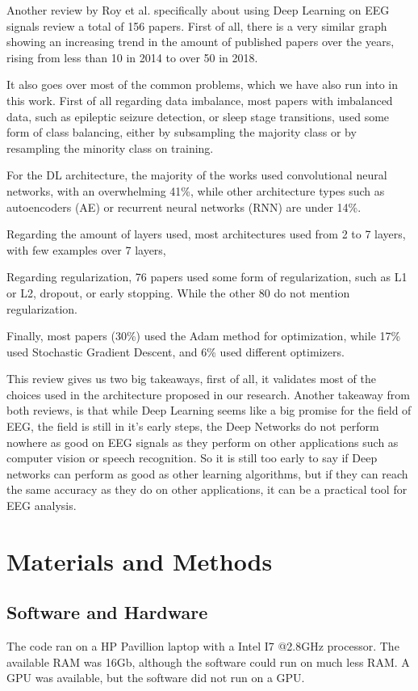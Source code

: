 \documentclass[conference]{IEEEtran}
\begin{document}
Another review by Roy et al.\cite{RoyReview} specifically about using Deep Learning on EEG signals review a total of 156 papers. First of all, there is a very similar graph showing an increasing trend in the amount of published papers over the years, rising from less than 10 in 2014 to over 50 in 2018.


It also goes over most of the common problems, which we have also run into in this work. First of all regarding data imbalance, most papers with imbalanced data, such as epileptic seizure detection, or sleep stage transitions, used some form of class balancing, either by subsampling the majority class or by resampling the minority class on training.

For the DL architecture, the majority of the works used convolutional neural networks, with an overwhelming 41\%, while other architecture types such as autoencoders (AE) or recurrent neural networks (RNN) are under 14\%.

Regarding the amount of layers used, most architectures used from 2 to 7 layers, with  few examples over 7 layers,

Regarding regularization, 76 papers used some form of regularization, such as L1 or L2, dropout, or early stopping. While the other 80 do not mention regularization.

Finally, most papers (30\%) used the Adam method for optimization, while 17\% used Stochastic Gradient Descent, and 6\% used different optimizers.

This review gives us two big takeaways, first of all, it validates most of the choices used in the architecture proposed in our research. 
Another takeaway from both reviews, is that while Deep Learning seems like a big promise for the field of EEG, the field is still in it's early steps, the Deep Networks do not perform nowhere as good on EEG signals as they perform on other applications such as computer vision  or speech recognition. So it is still too early to say if Deep networks can perform as good as other learning algorithms, but if they can reach the same accuracy as they do on other applications, it can be a practical tool for EEG analysis.



\section{Materials and Methods}


\subsection{Software and Hardware}
The code ran on a HP Pavillion laptop with a Intel I7 @2.8GHz processor. The available RAM was 16Gb, although the software could run on much less RAM. A GPU was available, but the software did not run on a GPU.
\end{document}
